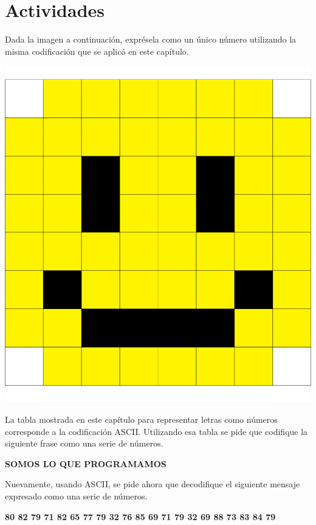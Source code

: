 \section{Actividades}

\begin{exercise}
Dada la imagen a continuación, exprésela como un único
número utilizando la misma codificación que se aplicó
en este capítulo.

\centerline{\includegraphics[scale=0.5]{capitulos/bajo_nivel/imagenes/pixels_smile.png}}
\end{exercise}

\begin{exercise}
La tabla mostrada en este capítulo para representar letras como números
corresponde a la codificación ASCII. Utilizando esa tabla se pide que codifique
la siguiente frase como una serie de números.

\textbf{SOMOS LO QUE PROGRAMAMOS}
\end{exercise}

\begin{exercise}
Nuevamente, usando ASCII, se pide ahora que decodifique el siguiente mensaje
expresado como una serie de números.

\textbf{80 82 79 71 82 65 77 79 32 76 85 69 71 79 32 69 88 73 83 84 79}
\end{exercise}


